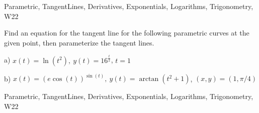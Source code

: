 \begin{tagblock}{Parametric, TangentLines, Derivatives, Exponentials, Logarithms, Trigonometry, W22}
\begin{question}

Find an equation for the tangent line for the following parametric curves at the given point, then parameterize the tangent lines.

\bigskip

a) $x(t)=\ln(t^2), \ y(t)=16^{\frac t 2}$, $t=1$

\bigskip

b) $x(t)=(e\cos(t))^{\sin(t)}, \ y(t)=\arctan(t^2+1)$, $(x,y)=(1,\pi/4)$
	
	
\begin{tags}
	    Parametric, TangentLines, Derivatives, Exponentials, Logarithms, Trigonometry, W22
\end{tags}
	
\begin{diary}
\end{diary}
	
\begin{solution}
	   
\end{solution}
	
\end{question}

\end{tagblock}

